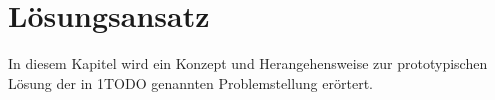 \chapter{Lösungsansatz}
\label{chap:loesung}
In diesem Kapitel wird ein Konzept und Herangehensweise zur prototypischen Lösung der in 1TODO genannten Problemstellung erörtert.





